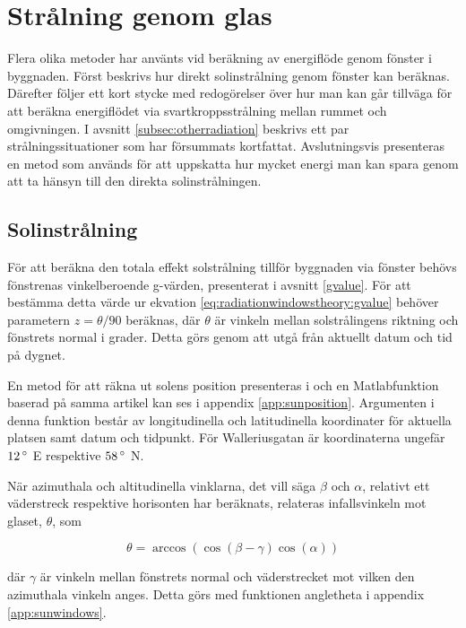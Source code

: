 \section{Strålning genom glas}\label{sec:sunthroughwindowsmethod}

Flera olika metoder har använts vid beräkning av energiflöde genom fönster i byggnaden. Först beskrivs hur direkt solinstrålning genom fönster kan beräknas. Därefter följer ett kort stycke med redogörelser över hur man kan går tillväga för att beräkna energiflödet via svartkroppsstrålning mellan rummet och omgivningen. I avsnitt \ref{subsec:otherradiation} beskrivs ett par strålningssituationer som har försummats kortfattat. Avslutningsvis presenteras en metod som används för att uppskatta hur mycket energi man kan spara genom att ta hänsyn till den direkta solinstrålningen.

\subsection{Solinstrålning}
För att beräkna den totala effekt solstrålning tillför byggnaden via fönster behövs fönstrenas vinkelberoende g-värden, presenterat i avsnitt \ref{gvalue}. För att bestämma detta värde ur ekvation \eqref{eq:radiationwindowstheory:gvalue} behöver parametern $z = \theta/90$ beräknas, där $\theta$ är vinkeln mellan solstrålingens riktning och fönstrets normal i grader. Detta görs genom att utgå från aktuellt datum och tid på dygnet.

En metod för att räkna ut solens position presenteras i \cite{walraven78} och en Matlabfunktion baserad på samma artikel kan ses i appendix \ref{app:sunposition}. Argumenten i denna funktion består av longitudinella och latitudinella koordinater för aktuella platsen samt datum och tidpunkt. För Walleriusgatan är koordinaterna ungefär $\unit[12]{^\circ}$ E respektive $\unit[58]{^\circ}$ N.

När azimuthala och altitudinella vinklarna, det vill säga $\beta$ och $\alpha$, relativt ett väderstreck respektive horisonten har beräknats, relateras infallsvinkeln mot glaset, $\theta$, som

\begin{equation} 
\theta = \arccos{\left( \cos{\left(\beta - \gamma\right)}\cos{\left(\alpha\right)}\right)}
\end{equation}

där $\gamma$ är vinkeln mellan fönstrets normal och väderstrecket mot vilken den azimuthala vinkeln anges. Detta görs med funktionen angletheta i appendix \ref{app:sunwindows}.

